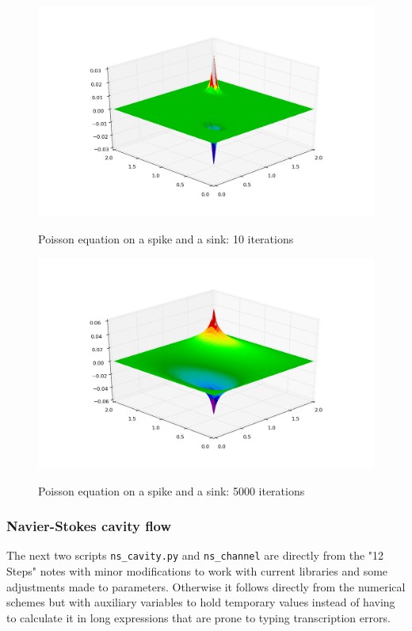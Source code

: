 \documentclass[11pt]{article}
\begin{document}
{	\begin{figure}[H]
	\centering
	\caption{Poisson equation on a spike and a sink: 10 iterations}
	\includegraphics[scale=0.7]{poisson_10.png}
	\label{fig:poisson_10}
	\end{figure}
	
	\begin{figure}[H]
	\centering
	\caption{Poisson equation on a spike and a sink: 5000 iterations}
	\includegraphics[scale=0.7]{poisson_5000.png}
	\label{fig:poisson_5000}
	\end{figure}
	
\subsubsection{Navier-Stokes cavity flow}
The next two scripts \texttt{ns\_cavity.py} and \texttt{ns\_channel} are directly from
the "12 Steps" notes with minor modifications to work with current libraries and some
adjustments made to parameters. Otherwise it follows directly from the numerical schemes
but with auxiliary variables to hold temporary values instead of having to calculate
it in long expressions that are prone to typing transcription errors.

}
\end{document}
